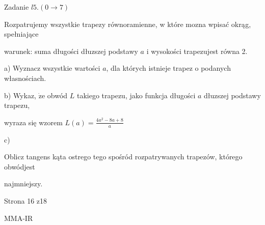 \documentclass[a4paper,12pt]{article}
\begin{document}
Zadanie $l5.(0\rightarrow 7)$

Rozpatrujemy wszystkie trapezy równoramienne, w które mozna wpisać okrąg, spełniające

warunek: suma długości dłuzszej podstawy $a$ i wysokości trapezujest równa 2.

a) Wyznacz wszystkie wartości $a$, dla których istnieje trapez o podanych własnościach.

b) Wykaz, $\dot{\mathrm{z}}\mathrm{e}$ obwód $L$ takiego trapezu, jako funkcja długości $a$ dłuzszej podstawy trapezu,

wyraza się wzorem $L(a)=\displaystyle \frac{4a^{2}-8a+8}{a}$

c)

Oblicz tangens kąta ostrego tego spośród rozpatrywanych trapezów, którego obwódjest

najmniejszy.

Strona 16 z18

MMA-IR
\end{document}
